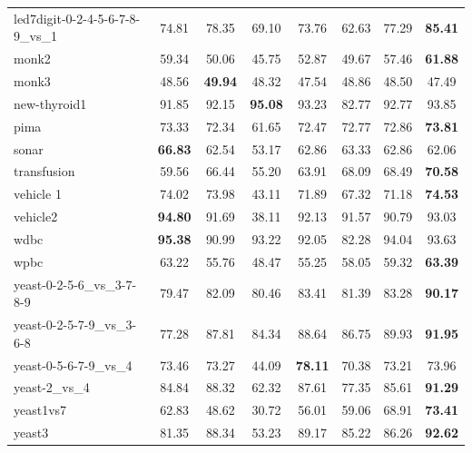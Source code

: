 \begin{table}[!p]
{\begin{tabular}{lccccccc}
led7digit-0-2-4-5-6-7-8-9\_vs\_1 & 74.81 & 78.35 & 69.10 & 73.76 & 62.63 & 77.29 & \textbf{85.41} \\
monk2 & 59.34 & 50.06 & 45.75 & 52.87 & 49.67 & 57.46 & \textbf{61.88} \\
monk3 & 48.56 & \textbf{49.94} & 48.32 & 47.54 & 48.86 & 48.50 & 47.49 \\
new-thyroid1 & 91.85 & 92.15 & \textbf{95.08} & 93.23 & 82.77 & 92.77 & 93.85 \\
pima & 73.33 & 72.34 & 61.65 & 72.47 & 72.77 & 72.86 & \textbf{73.81} \\
sonar & \textbf{66.83} & 62.54 & 53.17 & 62.86 & 63.33 & 62.86 & 62.06 \\
transfusion & 59.56 & 66.44 & 55.20 & 63.91 & 68.09 & 68.49 & \textbf{70.58} \\
vehicle 1 & 74.02 & 73.98 & 43.11 & 71.89 & 67.32 & 71.18 & \textbf{74.53} \\
vehicle2 & \textbf{94.80} & 91.69 & 38.11 & 92.13 & 91.57 & 90.79 & 93.03 \\
wdbc & \textbf{95.38} & 90.99 & 93.22 & 92.05 & 82.28 & 94.04 & 93.63 \\
wpbc & 63.22 & 55.76 & 48.47 & 55.25 & 58.05 & 59.32 & \textbf{63.39} \\
yeast-0-2-5-6\_vs\_3-7-8-9 & 79.47 & 82.09 & 80.46 & 83.41 & 81.39 & 83.28 & \textbf{90.17} \\
yeast-0-2-5-7-9\_vs\_3-6-8 & 77.28 & 87.81 & 84.34 & 88.64 & 86.75 & 89.93 & \textbf{91.95} \\
yeast-0-5-6-7-9\_vs\_4 & 73.46 & 73.27 & 44.09 & \textbf{78.11} & 70.38 & 73.21 & 73.96 \\
yeast-2\_vs\_4 & 84.84 & 88.32 & 62.32 & 87.61 & 77.35 & 85.61 & \textbf{91.29} \\
yeast1vs7 & 62.83 & 48.62 & 30.72 & 56.01 & 59.06 & 68.91 & \textbf{73.41} \\
yeast3 & 81.35 & 88.34 & 53.23 & 89.17 & 85.22 & 86.26 & \textbf{92.62} \\
\bottomrule
\end{tabular}}
\end{table}
